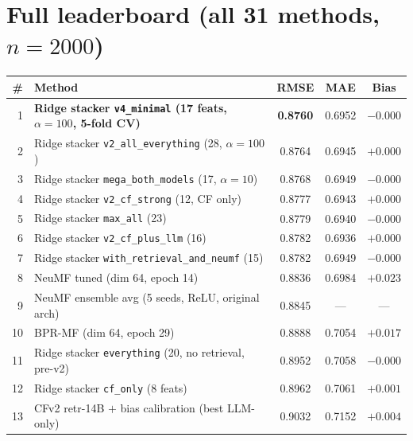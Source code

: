 \documentclass[11pt,a4paper]{article}
\newcommand{\best}[1]{\textcolor{goodgreen}{\textbf{#1}}}
\begin{document}
\section{Full leaderboard (all 31 methods, $n{=}2000$)}
\label{app:full_leaderboard}
\begin{table}[H]
\centering
\small
\begin{tabular}{rlccc}
\toprule
\# & Method & RMSE & MAE & Bias \\ \midrule
1  & \best{Ridge stacker \texttt{v4\_minimal} (17 feats, $\alpha{=}100$, 5-fold CV)} & \best{0.8760} & 0.6952 & $-0.000$ \\
2  & Ridge stacker \texttt{v2\_all\_everything} (28, $\alpha{=}100$)                & 0.8764        & 0.6945 & $+0.000$ \\
3  & Ridge stacker \texttt{mega\_both\_models} (17, $\alpha{=}10$)                  & 0.8768        & 0.6949 & $-0.000$ \\
4  & Ridge stacker \texttt{v2\_cf\_strong} (12, CF only)                            & 0.8777        & 0.6943 & $+0.000$ \\
5  & Ridge stacker \texttt{max\_all} (23)                                           & 0.8779        & 0.6940 & $-0.000$ \\
6  & Ridge stacker \texttt{v2\_cf\_plus\_llm} (16)                                  & 0.8782        & 0.6936 & $+0.000$ \\
7  & Ridge stacker \texttt{with\_retrieval\_and\_neumf} (15)                        & 0.8782        & 0.6949 & $-0.000$ \\
8  & NeuMF tuned (dim 64, epoch 14)                                                  & 0.8836        & 0.6984 & $+0.023$ \\
9  & NeuMF ensemble avg (5 seeds, ReLU, original arch)                               & 0.8845        & ---    & ---     \\
10 & BPR-MF (dim 64, epoch 29)                                                       & 0.8888        & 0.7054 & $+0.017$ \\
11 & Ridge stacker \texttt{everything} (20, no retrieval, pre-v2)                   & 0.8952        & 0.7058 & $-0.000$ \\
12 & Ridge stacker \texttt{cf\_only} (8 feats)                                       & 0.8962        & 0.7061 & $+0.001$ \\
13 & CFv2 retr-14B $+$ bias calibration (best LLM-only)                              & 0.9032        & 0.7152 & $+0.004$ \\

\end{tabular}
\end{table}
\end{document}
